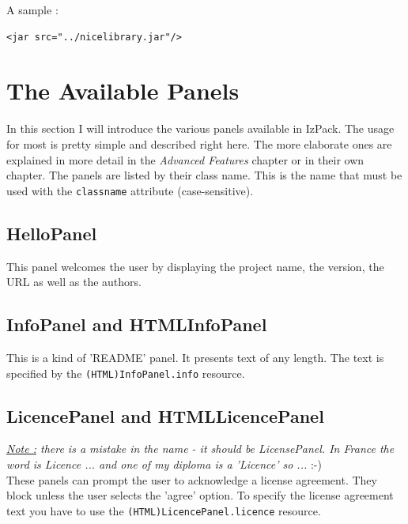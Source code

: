 A sample :
\footnotesize
\begin{verbatim}
<jar src="../nicelibrary.jar"/>
\end{verbatim}
\normalsize

\section{The Available Panels}

In this section I will introduce the various panels available in IzPack.
The usage for most is pretty simple and described right here. The more
elaborate ones are explained in more detail in the \textit{Advanced
Features} chapter or in their own chapter. The panels are listed by
their class name. This is the name that must be used with the
\texttt{classname} attribute (case-sensitive).\\

\subsection{HelloPanel}

This panel welcomes the user by displaying the project name, the
version, the URL as well as the authors.\\

\subsection{InfoPanel and HTMLInfoPanel}

This is a kind of 'README' panel. It presents text of any length. The
text is specified by the \texttt{(HTML)InfoPanel.info} resource.\\

\subsection{LicencePanel and HTMLLicencePanel}

\noindent
\textit{\underline{Note :} there is a mistake in the name - it should be
LicensePanel. In France the word is Licence ... and one of my diploma is a
'Licence' so ...} :-)\\

These panels can prompt the user to acknowledge a license agreement. They block
unless the user selects the 'agree' option. To specify the license agreement
text you have to use the \texttt{(HTML)LicencePanel.licence} resource.\\


